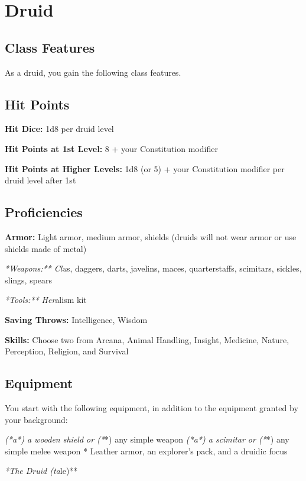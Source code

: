 \section{Druid}

\subsection{Class Features}

As a druid, you gain the following class features.

\subsection{Hit Points}

\textbf{Hit Dice:} 1d8 per druid level

\textbf{Hit Points at 1st Level:} 8 + your Constitution modifier

\textbf{Hit Points at Higher Levels:} 1d8 (or 5) + your Constitution modifier per druid level after 1st

\subsection{Proficiencies}

\textbf{Armor:} Light armor, medium armor, shields (druids will not wear armor or use shields made of metal)

\textit{*Weapons:** Clu}s, daggers, darts, javelins, maces, quarterstaffs, scimitars, sickles, slings, spears

\textit{*Tools:** Her}alism kit

\textbf{Saving Throws:} Intelligence, Wisdom

\textbf{Skills:} Choose two from Arcana, Animal Handling, Insight, Medicine, Nature, Perception, Religion, and Survival

\subsection{Equipment}

You start with the following equipment, in addition to the equipment granted by your background:

\textit{ (*a*) a wooden shield or (*}*) any simple weapon
\textit{ (*a*) a scimitar or (*}*) any simple melee weapon
* Leather armor, an explorer’s pack, and a druidic focus

\textit{*The Druid (ta}le)**

